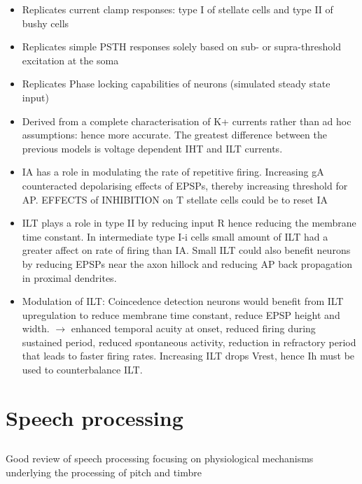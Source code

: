 \documentclass[10pt,a4paper]{article}
\begin{document}
\begin{itemize}
\item Replicates current clamp responses: type I of stellate cells and type II
  of bushy cells
\item Replicates simple PSTH responses solely based on sub- or supra-threshold
  excitation at the soma
\item Replicates Phase locking capabilities of neurons (simulated steady state
  input)
\item Derived from a complete characterisation of K+ currents rather than ad hoc
  assumptions: hence more accurate.  The greatest difference between the
  previous models is voltage dependent IHT and ILT currents.
\item IA has a role in modulating the rate of repetitive firing.  Increasing gA
  counteracted depolarising effects of EPSPs, thereby increasing threshold for
  AP.  EFFECTS of INHIBITION on T stellate cells could be to reset IA
\item ILT plays a role in type II by reducing input R hence reducing the
  membrane time constant.  In intermediate type I-i cells small amount of ILT
  had a greater affect on rate of firing than IA. Small ILT could also benefit
  neurons by reducing EPSPs near the axon hillock and reducing AP back
  propagation in proximal dendrites.
\item Modulation of ILT: Coincedence detection neurons would benefit from ILT
  upregulation to reduce membrane time constant, reduce EPSP height and
  width. \ensuremath{\rightarrow} enhanced temporal acuity at onset, reduced
  firing during sustained period, reduced spontaneous activity, reduction in
  refractory period that leads to faster firing rates.  Increasing ILT drops
  Vrest, hence Ih must be used to counterbalance ILT.
\end{itemize}

\section{Speech processing}

\subsection{\citep{PalmerShamma:2003} }
Good review of speech processing focusing on
physiological mechanisms underlying the processing of pitch and timbre
\end{document}
